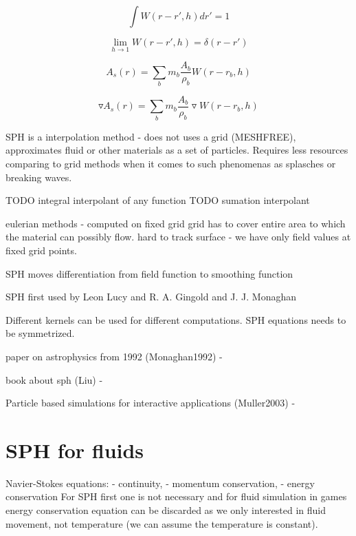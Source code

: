 \begin{equation}
\label{eq:sph_kernel_property_1}
\int W(r - r', h)dr' = 1
\end{equation}

\begin{equation}
\label{eq:sph_kernel_property_2}
\lim_{h \to 1}W(r - r', h) = \delta(r-r')
\end{equation}

\begin{equation}
\label{eq:sumation_interpolant}
A_s(r) = \sum_{b}m_b\frac{A_b}{\rho_b}W(r-r_b,h)
\end{equation}

\begin{equation}
\label{eq:sumation_interpolant_gradient}
\triangledown A_s(r) = \sum_{b}m_b\frac{A_b}{\rho_b}\triangledown W(r-r_b,h) 
\end{equation}

SPH is a interpolation method - does not uses a grid (MESHFREE), approximates fluid or other materials as a set of particles. Requires less resources comparing to grid methods when it comes to such phenomenas as splasches or breaking waves. 

TODO integral interpolant of any function
TODO sumation interpolant

eulerian methods - computed on fixed grid
	grid has to cover entire area to which the material can possibly flow. 
	hard to track surface - we have only field values at fixed grid points. 

SPH moves differentiation from field function to smoothing function

SPH first used by Leon Lucy and R. A. Gingold and J. J. Monaghan

Different kernels can be used for different computations.
SPH equations needs to be symmetrized.

paper on astrophysics from 1992 (Monaghan1992) - \cite{Monaghan1992}

book about sph (Liu) - \cite{Liu}

Particle based simulations for interactive applications (Muller2003) - \cite{Muller2003}

\section{SPH for fluids}

Navier-Stokes equations: 
 - continuity, 
 - momentum conservation, 
 - energy conservation
For SPH first one is not necessary and for fluid simulation in games energy conservation equation can be discarded as we only interested in fluid movement, not temperature (we can assume the temperature is constant). 